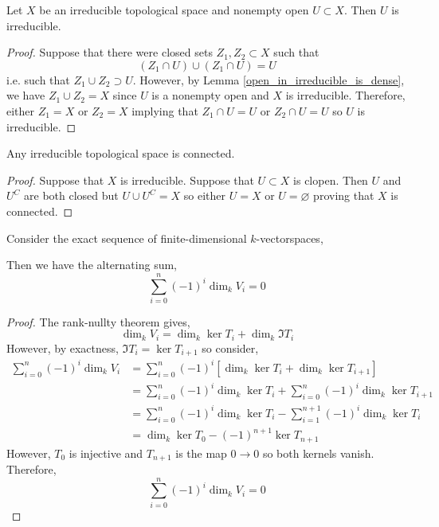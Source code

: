 \documentclass[12pt]{article}
\begin{document}
\begin{lemma} \label{open_of_irreducible}
Let $X$ be an irreducible topological space and nonempty open $U \subset X$. Then $U$ is irreducible.
\end{lemma}

\begin{proof}
Suppose that there were closed sets $Z_1, Z_2 \subset X$ such that
 \[ (Z_1 \cap U) \cup (Z_1 \cap U) = U \]
 i.e. such that $Z_1 \cup Z_2 \supset U$. However, by Lemma \ref{open_in_irreducible_is_dense}, we have $Z_1 \cup Z_2 = X$ since $U$ is a nonempty open and $X$ is irreducible. Therefore, either $Z_1 = X$ or $Z_2 = X$ implying that $Z_1 \cap U = U$ or $Z_2 \cap U = U$ so $U$ is irreducible.   
\end{proof}

\begin{lemma} \label{irreducible_implies_connected}
Any irreducible topological space is connected.
\end{lemma}

\begin{proof}
Suppose that $X$ is irreducible. Suppose that $U \subset X$ is clopen. Then $U$ and $U^C$ are both closed but $U \cup U^C = X$ so either $U = X$ or $U = \varnothing$ proving that $X$ is connected. 
\end{proof}



\begin{lemma} \label{alt_sum_exact}
Consider the exact sequence of finite-dimensional $k$-vectorspaces,
\begin{center}
\end{center}
Then we have the alternating sum,
\[ \sum_{i = 0}^n (-1)^i \dim_k V_i = 0 \]
\end{lemma}

\begin{proof}
The rank-nullty theorem gives,
\[ \dim_k{V_i} = \dim_k{\ker{T_i}} + \dim_k{\Im{T_i}} \]
However, by exactness, $\Im{T_i} = \ker{T_{i+1}}$ so consider,
\begin{align*}
\sum_{i = 0}^n (-1)^i \dim_k V_i & = \sum_{i = 0}^n (-1)^i \left[ \dim_k{\ker{T_i}} + \dim_k{\ker{T_{i + 1}}} \right]
\\
& = \sum_{i = 0}^n (-1)^i  \dim_k{\ker{T_i}} + \sum_{i = 0}^{n} (-1)^i  \dim_k{\ker{T_{i+1}}} 
\\
& = \sum_{i = 0}^n (-1)^i  \dim_k{\ker{T_i}} - \sum_{i = 1}^{n+1} (-1)^i  \dim_k{\ker{T_{i}}}
\\
& = \dim_k{\ker{T_0}} - (-1)^{n+1} \ker{T_{n+1}}
\end{align*}
However, $T_0$ is injective and $T_{n+1}$ is the map $0 \to 0$ so both kernels vanish. Therefore,
\[ \sum_{i = 0}^n (-1)^i \dim_k V_i = 0 \]
\end{proof}
\end{document}
